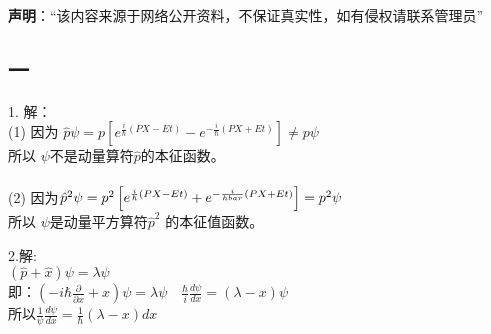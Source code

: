 
\textbf{声明}：“该内容来源于网络公开资料，不保证真实性，如有侵权请联系管理员”


\subsection{一}
1. 解：\\
(1) 因为 $\hat{p} \psi = p\left[e^{\frac{i}{\hbar}(PX - Et)} - e^{-\frac{i}{\hbar}(PX + Et)}\right] \neq p\psi$\\
所以 $\psi$不是动量算符$\hat{p}$的本征函数。\\\\
(2) 因为$\hat{p}^2 \psi = p^2\left[e^{\frac{i}{\hbar}(PX - Et)} + e^{-\frac{i}{\\hbar}(PX + Et)}\right] = p^2\psi$ \\
所以 $\psi$是动量平方算符$\hat{p}^2$ 的本征值函数。 

2.解:\\
$(\hat{p} + \hat{x})\psi = \lambda \psi$\\
即：$(-i\hbar\frac{\partial}{\partial x} + x)\psi = \lambda \psi \quad \frac{\hbar}{i} \frac{d\psi}{dx} = (\lambda - x)\psi$ \\
所以$\frac{1}{\psi} \frac{d\psi}{dx} = \frac{1}{\hbar}(\lambda - x)dx$